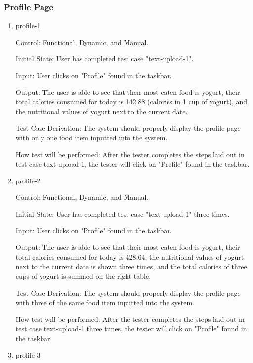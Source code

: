 \documentclass[12pt, titlepage]{article}
\begin{document}
	\subsubsection{Profile Page}
	\begin{enumerate}
		\item{profile-1\\}
		
		Control: Functional, Dynamic, and Manual.
		
		Initial State: User has completed test case "text-upload-1".
		
		Input: User clicks on "Profile" found in the taskbar.
		
		Output: The user is able to see that their most eaten food is yogurt, their total calories consumed for today is 142.88 (calories in 1 cup of yogurt), and the nutritional values of yogurt next to the current date.
		
		Test Case Derivation: The system should properly display the profile page with only one food item inputted into the system.
		
		How test will be performed: After the tester completes the steps laid out in test case text-upload-1, the tester will click on "Profile" found in the taskbar.
		
		\item{profile-2\\}
		
		Control: Functional, Dynamic, and Manual.
		
		Initial State: User has completed test case "text-upload-1" three times.
		
		Input: User clicks on "Profile" found in the taskbar.
		
		Output: The user is able to see that their most eaten food is yogurt, their total calories consumed for today is 428.64, the nutritional values of yogurt next to the current date is shown three times, and the total calories of three cups of yogurt is summed on the right table.
		
		Test Case Derivation: The system should properly display the profile page with three of the same food item inputted into the system.
		
		How test will be performed: After the tester completes the steps laid out in test case text-upload-1 three times, the tester will click on "Profile" found in the taskbar.
		
		\item{profile-3\\}
		

\end{enumerate}
\end{document}
